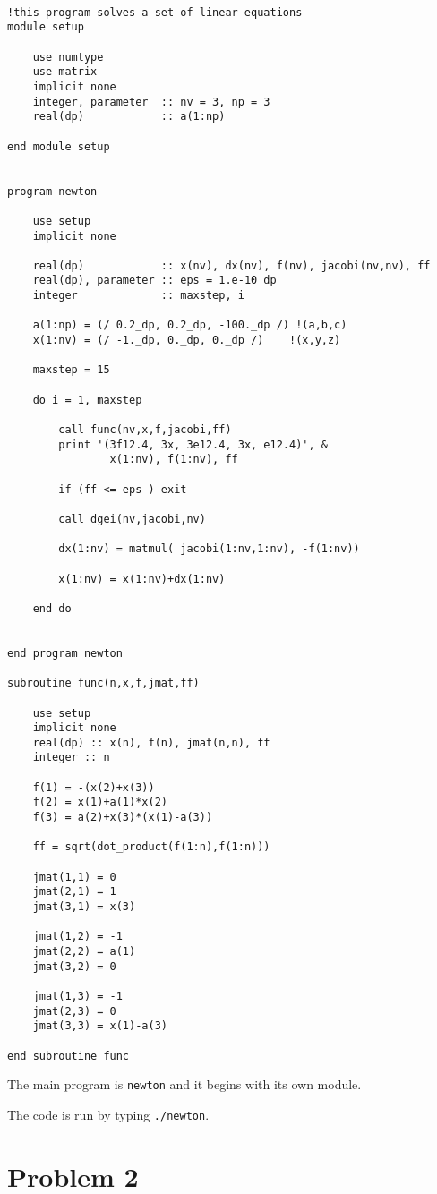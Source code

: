 \documentclass[12pt]{article}
\begin{document}
\begin{lstlisting}[frame=single,caption={ {\tt newton.f95}},label=module]

!this program solves a set of linear equations
module setup

	use numtype
	use matrix
	implicit none
	integer, parameter 	:: nv = 3, np = 3
	real(dp) 			:: a(1:np)

end module setup


program newton

	use setup
	implicit none

	real(dp) 			:: x(nv), dx(nv), f(nv), jacobi(nv,nv), ff
	real(dp), parameter :: eps = 1.e-10_dp
	integer				:: maxstep, i

	a(1:np) = (/ 0.2_dp, 0.2_dp, -100._dp /) !(a,b,c)
	x(1:nv) = (/ -1._dp, 0._dp, 0._dp /) 	!(x,y,z)

	maxstep = 15

	do i = 1, maxstep

		call func(nv,x,f,jacobi,ff)
		print '(3f12.4, 3x, 3e12.4, 3x, e12.4)', &
				x(1:nv), f(1:nv), ff

		if (ff <= eps ) exit

		call dgei(nv,jacobi,nv) 

		dx(1:nv) = matmul( jacobi(1:nv,1:nv), -f(1:nv))

		x(1:nv) = x(1:nv)+dx(1:nv)

	end do


end program newton

subroutine func(n,x,f,jmat,ff)

	use setup
	implicit none
	real(dp) :: x(n), f(n), jmat(n,n), ff
	integer :: n

	f(1) = -(x(2)+x(3))
	f(2) = x(1)+a(1)*x(2)
	f(3) = a(2)+x(3)*(x(1)-a(3))

	ff = sqrt(dot_product(f(1:n),f(1:n)))

	jmat(1,1) = 0
	jmat(2,1) = 1
	jmat(3,1) = x(3)

	jmat(1,2) = -1
	jmat(2,2) = a(1)
	jmat(3,2) = 0

	jmat(1,3) = -1
	jmat(2,3) = 0
	jmat(3,3) = x(1)-a(3)

end subroutine func

\end{lstlisting}

The main program is {\tt newton} and it begins with its own module. 


The code is run by typing {\tt ./newton}.

\section{Problem 2}
\end{document}
